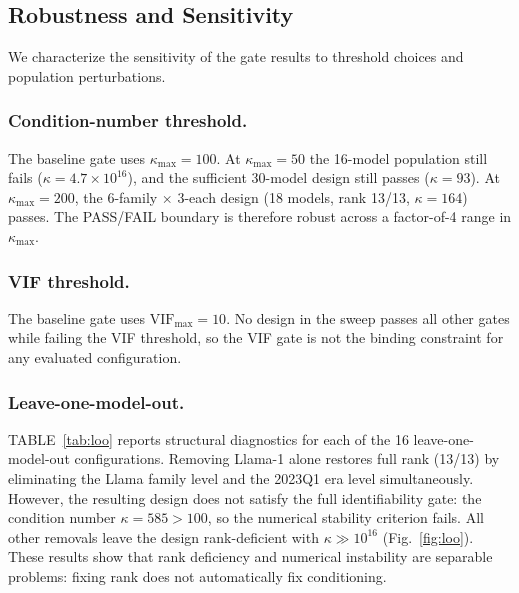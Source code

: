 \documentclass[11pt]{article}
\theoremstyle{definition}
\theoremstyle{plain}
\begin{document}
\subsection{Robustness and Sensitivity}
We characterize the sensitivity of the gate results to threshold choices and population perturbations.

\subsubsection{Condition-number threshold.} The baseline gate uses $\kappa_{\max} = 100$. At $\kappa_{\max} = 50$ the 16-model population still fails ($\kappa = 4.7 \times 10^{16}$), and the sufficient 30-model design still passes ($\kappa = 93$). At $\kappa_{\max} = 200$, the 6-family $\times$ 3-each design (18 models, rank 13/13, $\kappa = 164$) passes. The PASS/FAIL boundary is therefore robust across a factor-of-4 range in $\kappa_{\max}$.

\subsubsection{VIF threshold.} The baseline gate uses $\text{VIF}_{\max} = 10$. No design in the sweep passes all other gates while failing the VIF threshold, so the VIF gate is not the binding constraint for any evaluated configuration.

\subsubsection{Leave-one-model-out.} TABLE~\ref{tab:loo} reports structural diagnostics for each of the 16 leave-one-model-out configurations. Removing Llama-1 alone restores full rank (13/13) by eliminating the Llama family level and the 2023Q1 era level simultaneously. However, the resulting design does not satisfy the full identifiability gate: the condition number $\kappa = 585 > 100$, so the numerical stability criterion fails. All other removals leave the design rank-deficient with $\kappa \gg 10^{16}$ (Fig.~\ref{fig:loo}). These results show that rank deficiency and numerical instability are separable problems: fixing rank does not automatically fix conditioning.
\end{document}
